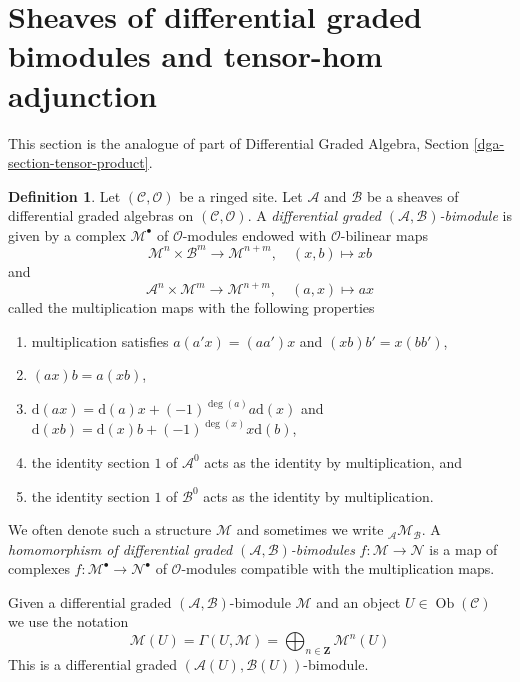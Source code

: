 \documentclass{stacks-project}
\theoremstyle{plain}
\theoremstyle{definition}
\newtheorem{definition}[subsection]{Definition}
\theoremstyle{remark}
\numberwithin{equation}{subsection}
\def\Ob{\mathop{\mathrm{Ob}}\nolimits}
\begin{document}
\section{Sheaves of differential graded bimodules and tensor-hom adjunction}
\label{section-dg-bimodules}

\noindent
This section is the analogue of part of
Differential Graded Algebra, Section \ref{dga-section-tensor-product}.

\begin{definition}
\label{definition-dg-bimodule}
Let $(\mathcal{C}, \mathcal{O})$ be a ringed site. Let $\mathcal{A}$
and $\mathcal{B}$ be a sheaves of differential graded algebras on
$(\mathcal{C}, \mathcal{O})$. A
{\it differential graded $(\mathcal{A}, \mathcal{B})$-bimodule}
is given by a complex $\mathcal{M}^\bullet$
of $\mathcal{O}$-modules endowed with $\mathcal{O}$-bilinear maps
$$
\mathcal{M}^n \times \mathcal{B}^m \to \mathcal{M}^{n + m},\quad
(x, b) \longmapsto xb
$$
and
$$
\mathcal{A}^n \times \mathcal{M}^m \to \mathcal{M}^{n + m},\quad
(a, x) \longmapsto ax
$$
called the multiplication maps with the following properties
\begin{enumerate}
\item multiplication satisfies $a(a'x) = (aa')x$ and
$(xb)b' = x(bb')$,
\item $(ax)b = a(xb)$,
\item $\text{d}(ax) = \text{d}(a) x + (-1)^{\deg(a)}a \text{d}(x)$ and
$\text{d}(xb) = \text{d}(x) b + (-1)^{\deg(x)}x \text{d}(b)$,
\item the identity section $1$ of $\mathcal{A}^0$ acts as the
identity by multiplication, and
\item the identity section $1$ of
$\mathcal{B}^0$ acts as the identity by multiplication.
\end{enumerate}
We often denote such a structure $\mathcal{M}$ and sometimes
we write ${}_\mathcal{A}\mathcal{M}_\mathcal{B}$.
A {\it homomorphism of differential graded
$(\mathcal{A}, \mathcal{B})$-bimodules}
$f : \mathcal{M} \to \mathcal{N}$ is a map of complexes
$f : \mathcal{M}^\bullet \to \mathcal{N}^\bullet$
of $\mathcal{O}$-modules compatible with the multiplication maps.
\end{definition}

\noindent
Given a differential graded $(\mathcal{A}, \mathcal{B})$-bimodule $\mathcal{M}$
and an object $U \in \Ob(\mathcal{C})$ we use the notation
$$
\mathcal{M}(U) =
\Gamma(U, \mathcal{M}) =
\bigoplus\nolimits_{n \in \mathbf{Z}} \mathcal{M}^n(U)
$$
This is a differential graded $(\mathcal{A}(U), \mathcal{B}(U))$-bimodule.
\end{document}
